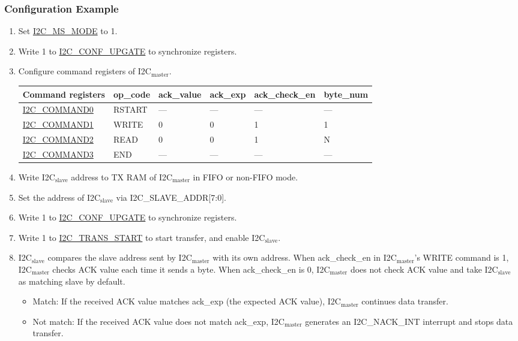 \documentclass[main\_\_EN.tex]{subfiles}
\begin{document}
\subsubsection{Configuration Example}
\begin{enumerate}
\item Set \hyperref[fielddesc:I2CMSMODE]{I2C\_MS\_MODE} to 1.
\item Write 1 to \hyperref[fielddesc:I2CCONFUPGATE]{I2C\_CONF\_UPGATE} to synchronize registers.
\item Configure command registers of I2C$_\text{master}$.
\begin{longtable}{ | p{4cm} | p{2cm} | p{2cm} | p{2cm} |p{2cm} | p{2cm} |}
\hline\rowcolor{lightgray}
Command registers & op\_code & ack\_value&ack\_exp&ack\_check\_en&byte\_num  \\ \hline
\hyperref[fielddesc:I2CCOMMAND0]{I2C\_COMMAND0} & RSTART& ---&---&---&---  \\ \hline
\hyperref[fielddesc:I2CCOMMAND1]{I2C\_COMMAND1} & WRITE& 0&0&1&1  \\ \hline
\hyperref[fielddesc:I2CCOMMAND2]{I2C\_COMMAND2} & READ& 0&0&1&N  \\ \hline
\hyperref[fielddesc:I2CCOMMAND3]{I2C\_COMMAND3} & END& ---&---&---&---  \\ \hline
\end{longtable}
\item Write I2C$_\text{slave}$ address to TX RAM of I2C$_\text{master}$ in FIFO or non-FIFO mode.
\item Set the address of I2C$_\text{slave}$ via I2C\_SLAVE\_ADDR[7:0].
\item Write 1 to \hyperref[fielddesc:I2CCONFUPGATE]{I2C\_CONF\_UPGATE} to synchronize registers.
\item Write 1 to \hyperref[fielddesc:I2CTRANSSTART]{I2C\_TRANS\_START}  to start transfer, and enable I2C$_\text{slave}$.

\item I2C$_\text{slave}$ compares the slave address sent by I2C$_\text{master}$ with its own address. When ack\_check\_en in I2C$_\text{master}$'s WRITE command is 1, I2C$_\text{master}$ checks ACK value each time it sends a byte. When ack\_check\_en is 0, I2C$_\text{master}$ does not check ACK value and take I2C$_\text{slave}$ as matching slave by default.
\begin{itemize}
\item Match: If the received ACK value matches ack\_exp (the expected ACK value), I2C$_\text{master}$ continues data transfer.
\item Not match: If the received ACK value does not match ack\_exp, I2C$_\text{master}$ generates an I2C\_NACK\_INT interrupt and stops data transfer.
\end{itemize}


\end{enumerate}
\end{document}
